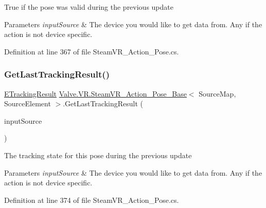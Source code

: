 True if the pose was valid during the previous update 


\begin{DoxyParams}{Parameters}
{\em input\+Source} & The device you would like to get data from. Any if the action is not device specific.\\
\hline
\end{DoxyParams}


Definition at line 367 of file Steam\+V\+R\+\_\+\+Action\+\_\+\+Pose.\+cs.

\mbox{\label{class_valve_1_1_v_r_1_1_steam_v_r___action___pose___base_a3c4f99bc27df78ccb09f30f20503c20e}} 
\subsubsection{\texorpdfstring{GetLastTrackingResult()}{GetLastTrackingResult()}}
{\footnotesize\ttfamily \mbox{\hyperlink{namespace_valve_1_1_v_r_abe6feab98f33191b7c27b4292012e90a}{E\+Tracking\+Result}} \mbox{\hyperlink{class_valve_1_1_v_r_1_1_steam_v_r___action___pose___base}{Valve.\+V\+R.\+Steam\+V\+R\+\_\+\+Action\+\_\+\+Pose\+\_\+\+Base}}$<$ Source\+Map, Source\+Element $>$.Get\+Last\+Tracking\+Result (\begin{DoxyParamCaption}\item[{\mbox{\hyperlink{namespace_valve_1_1_v_r_a82e5bf501cc3aa155444ee3f0662853f}{Steam\+V\+R\+\_\+\+Input\+\_\+\+Sources}}}]{input\+Source }\end{DoxyParamCaption})}



The tracking state for this pose during the previous update 


\begin{DoxyParams}{Parameters}
{\em input\+Source} & The device you would like to get data from. Any if the action is not device specific.\\
\hline
\end{DoxyParams}


Definition at line 374 of file Steam\+V\+R\+\_\+\+Action\+\_\+\+Pose.\+cs.


